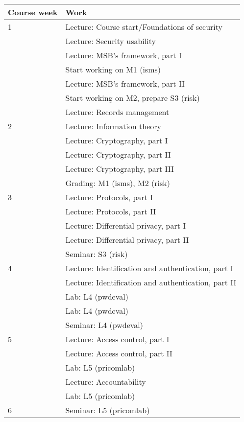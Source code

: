 \begin{table}
	\centering
  \begin{tabular}{lp{9cm}}
    \toprule
    \textbf{Course week}	& \textbf{Work} \\
    \midrule
    1
      & Lecture: Course start/Foundations of security\\
      & Lecture: Security usability\\
      & Lecture: MSB's framework, part I\\
      & Start working on M1 (isms)\\
      & Lecture: MSB's framework, part II\\
      & Start working on M2, prepare S3 (risk)\\
      & Lecture: Records management\\
    \midrule
    2
      & Lecture: Information theory\\
      & Lecture: Cryptography, part I\\
      & Lecture: Cryptography, part II\\
      & Lecture: Cryptography, part III\\
      & Grading: M1 (isms), M2 (risk)\\
    \midrule
    3
      & Lecture: Protocols, part I\\
      & Lecture: Protocols, part II\\
      & Lecture: Differential privacy, part I\\
      & Lecture: Differential privacy, part II\\
      & Seminar: S3 (risk)\\
    \midrule
    4
      & Lecture: Identification and authentication, part I\\
      & Lecture: Identification and authentication, part II\\
      & Lab: L4 (pwdeval)\\
      & Lab: L4 (pwdeval)\\
      & Seminar: L4 (pwdeval)\\
    \midrule
    5
      & Lecture: Access control, part I\\
      & Lecture: Access control, part II\\
      & Lab: L5 (pricomlab)\\
      & Lecture: Accountability\\
      & Lab: L5 (pricomlab)\\
    \midrule
    6
      & Seminar: L5 (pricomlab)\\

\end{tabular}
\end{table}
